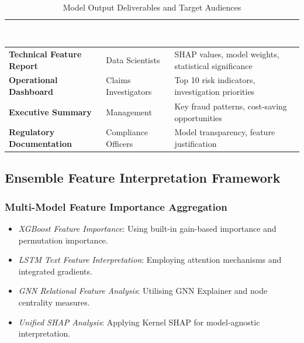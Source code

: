 \documentclass[12pt,a4paper,oneside]{report}
\numberwithin{equation}{chapter}
\renewcommand{\arraystretch}{1.6}
\begin{document}
\begin{table}[H]
\centering
\caption{Model Output Deliverables and Target Audiences}
\label{tab:model_deliverables}
\renewcommand{\arraystretch}{1.4}
\begin{tabular}{L{4.5cm} L{3.5cm} L{5.5cm}}
\toprule
{}
\textcolor{white}{\textbf{Deliverable Type}} &
\textcolor{white}{\textbf{Target Audience}} &
\textcolor{white}{\textbf{Content Focus}} \\
\midrule
{}
\textbf{Technical Feature Report} & Data Scientists & SHAP values, model weights, statistical significance \\
\textbf{Operational Dashboard} & Claims Investigators & Top 10 risk indicators, investigation priorities \\
\textbf{Executive Summary} & Management & Key fraud patterns, cost-saving opportunities \\
\textbf{Regulatory Documentation} & Compliance Officers & Model transparency, feature justification \\
\bottomrule
\end{tabular}
\end{table}

\subsection{Ensemble Feature Interpretation Framework}
\label{subsec:feature-interpretation}

\subsubsection{Multi-Model Feature Importance Aggregation}

\begin{itemize}
    \item \textit{XGBoost Feature Importance}: Using built-in gain-based importance and permutation importance.
    \item \textit{LSTM Text Feature Interpretation}: Employing attention mechanisms and integrated gradients.
    \item \textit{GNN Relational Feature Analysis}: Utilising GNN Explainer and node centrality measures.
    \item \textit{Unified SHAP Analysis}: Applying Kernel SHAP for model-agnostic interpretation.
\end{itemize}
\end{document}
